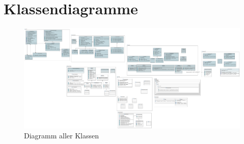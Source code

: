 \chapter{Klassendiagramme}
\label{ch:klassendiagramme}

\begin{figure}[hb]
  \centering
  \includegraphics[width=380pt]{resourcen/MainDiagramm.pdf}
  \caption{Diagramm aller Klassen}
  \label{fig:mainDiagramm}
\end{figure}